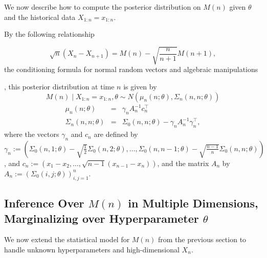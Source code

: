 \documentclass[12pt,english]{article}
\newcommand{\stedit}[1]{{\color{blue} #1}}
\begin{document}
We now describe how to compute the posterior distribution on $M(n)$ given $\theta$ and the historical data $X_{1:n}=x_{1:n}$. \stedit{By the following relationship

\[
\sqrt{n}\left(X_{n}-X_{n+1}\right)=M\left(n\right)-\sqrt{\frac{n}{n+1}}M\left(n+1\right),
\]
the conditioning formula for normal random vectors \citep{glasserman:mc} and algebraic manipulations}, this posterior distribution at time $n$ is given by
\[
M\left(n\right)\mid X_{1:n} = x_{1:n},\theta\sim N\left(\mu_{n}\left(n;\theta\right),\Sigma_{n}\left(n,n;\theta\right)\right)
\]
\begin{eqnarray*}
\mu_{n}\left(n;\theta\right)  &=& \gamma_{n}A_{n}^{-1}c_{n}^\intercal\\
\Sigma_{n}\left(n,n;\theta\right) &=&  \Sigma_{0}\left(n,n;\theta\right)-\gamma_{n}A_{n}^{-1}\gamma_{n}^\intercal,
\end{eqnarray*}
where the vectors $\gamma_{n}$ and $c_{n}$ are defined by $\gamma_{n}:=\left(\Sigma_{0}\left(n,1;\theta\right)-\sqrt{\frac{1}{2}}\Sigma_{0}\left(n,2;\theta\right),\ldots,\Sigma_{0}\left(n,n-1;\theta\right)-\sqrt{\frac{n-1}{n}}\Sigma_{0}\left(n,n;\theta\right)\right)$, and
$c_{n}:=\left(x_{1}-x_{2},\ldots,\sqrt{n-1}\left(x_{n-1}-x_{n}\right)\right)$,
and the matrix $A_{n}$ by $A_{n}:=(\Sigma_{0}\left(i,j;\theta\right))_{i,j=1}^{n}$.



\subsection{Inference Over $M(n)$ in Multiple Dimensions, Marginalizing over Hyperparameter $\theta$}
We now extend the statistical model for $M(n)$ from the previous section to handle unknown hyperparameters and high-dimensional $X_{n}$.
\end{document}
